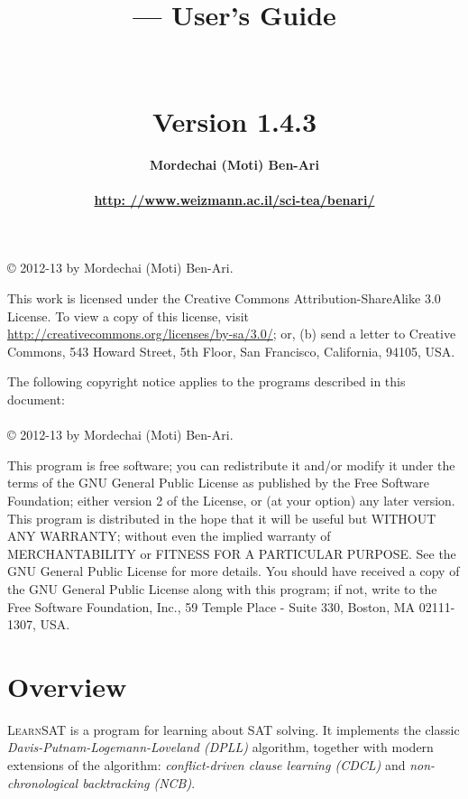 \documentclass[11pt]{article}
\title{\bfseries \ls{} --- User's Guide\\\mbox{}\\\mbox{}\\
\bfseries\normalsize Version 1.4.3}
\author{\bfseries Mordechai (Moti) Ben-Ari\\\mbox{}\\
\url{http: //www.weizmann.ac.il/sci-tea/benari/}}
\newcommand*{\ls}{\textsc{LearnSAT}}
\begin{document}
\maketitle

\thispagestyle{empty}

\vspace*{\fill}

\begin{center}
\copyright{} 2012-13 by Mordechai (Moti) Ben-Ari.
\end{center}
This work is licensed under the Creative Commons Attribution-ShareAlike 3.0
License. To view a copy of this license, visit
\url{http://creativecommons.org/licenses/by-sa/3.0/}; or, (b) send a letter
to Creative Commons, 543 Howard Street, 5th Floor, San Francisco,
California, 94105, USA.

\bigskip\bigskip

 
\begin{center}
The following copyright notice applies to the programs described in this
document:\mbox{}\\\mbox{}\\
\copyright{} 2012-13 by Mordechai (Moti) Ben-Ari.
\end{center}

This program is free software; you can redistribute it and/or
modify it under the terms of the GNU General Public License
as published by the Free Software Foundation; either version 2
of the License, or (at your option) any later version.
This program is distributed in the hope that it will be useful
but WITHOUT ANY WARRANTY; without even the implied warranty of
MERCHANTABILITY or FITNESS FOR A PARTICULAR PURPOSE.
See the GNU General Public License for more details.
You should have received a copy of the GNU General Public License
along with this program; if not, write to the Free Software
Foundation, Inc., 59 Temple Place - Suite 330, Boston, MA
02111-1307, USA.

\setcounter{page}{0}
\newpage

\section{Overview}

\ls{} is a program for learning about SAT solving. It implements the
classic \emph{Davis-Putnam-Logemann-Loveland (DPLL)} algorithm, together
with modern extensions of the algorithm: \emph{conflict-driven clause
learning (CDCL)} and \emph{non-chronological backtracking (NCB)}.
\end{document}
